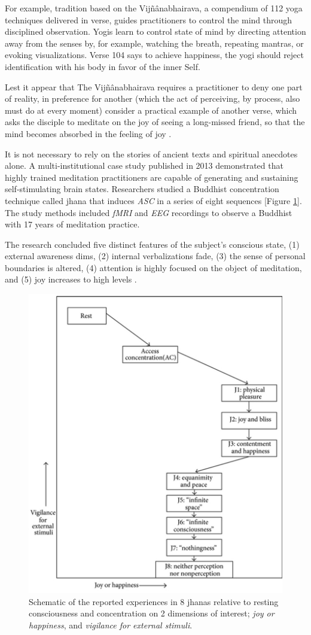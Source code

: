 \documentclass{UIdahoMastersThesis}
\begin{document}
For example, tradition based on the Vij\~{n}\^{a}nabhairava, a compendium of 112 yoga techniques delivered in verse, guides practitioners to control the mind through disciplined observation. Yogis learn to control state of mind by directing attention away from the senses by, for example, watching the breath, repeating mantras, or evoking visualizations. Verse 104 says to achieve happiness, the yogi should reject identification with his body in favor of the inner Self. 

Lest it appear that The Vij\~{n}\^{a}nabhairava requires a practitioner to deny one part of reality, in preference for another (which the act of perceiving, by process, also must do at every moment) consider a practical example of another verse, which asks the disciple to meditate on the joy of seeing a long-missed friend, so that the mind becomes absorbed in the feeling of joy \cite{singh_vijnanabhairava_2002}.

It is not necessary to rely on the stories of ancient texts and spiritual anecdotes alone. A multi-institutional case study published in 2013 demonstrated that highly trained meditation practitioners are capable of generating and sustaining self-stimulating brain states. Researchers studied a Buddhist concentration technique called jhana that induces \textit{\ac{ASC}} in a series of eight sequences [Figure \ref{fig:graphjoy}]. The study methods included \textit{\ac{fMRI}} and \textit{\ac{EEG}} recordings to observe a Buddhist with 17 years of meditation practice. 

The research concluded five distinct features of the subject's conscious state, (1) external awareness dims, (2) internal verbalizations fade, (3) the sense of personal boundaries is altered, (4) attention is highly focused on the object of meditation, and (5) joy increases to high levels \cite{michael_r._hagerty_case_2013}.

\begin{figure}[h!]
	\centering
	\includegraphics[width=0.63\linewidth]{graph_joy.png}
	\caption{Schematic of the reported experiences in 8 jhanas relative to resting consciousness and concentration on 2 dimensions of interest; \emph{joy or happiness}, and \emph{vigilance for external stimuli}.}
	\label{fig:graphjoy}
\end{figure}
\end{document}
